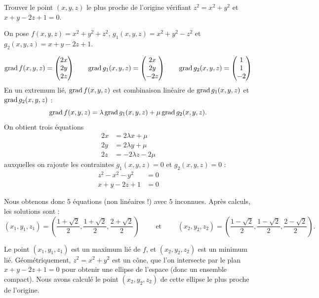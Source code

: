 \documentclass[11pt, class=report,crop=false]{standalone}
\begin{document}
\begin{exemple}
Trouver le point $(x,y,z)$ le plus proche de l'origine vérifiant $z^2 = x^2 + y^2$ et $x + y -2z+1=0$.

On pose $f(x,y,z) = x^2 + y^2 + z^2$, $g_1(x,y,z)= x^2 + y^2 - z^2$ et $g_2(x,y,z) = x + y -2z+1$.
 
$$
\operatorname{grad} f(x,y,z) = \begin{pmatrix} 2x \\ 2y \\ 2z \end{pmatrix}
\qquad \operatorname{grad} g_1(x,y,z) = \begin{pmatrix} 2x \\ 2y \\ -2z \end{pmatrix}
\qquad \operatorname{grad} g_2(x,y,z) = \begin{pmatrix} 1 \\ 1 \\ -2 \end{pmatrix}
$$
En un extremum lié, $\operatorname{grad} f(x,y,z)$ est combinaison linéaire de $\operatorname{grad} g_1(x,y,z)$
et $\operatorname{grad} g_2(x,y,z)$ :
$$\operatorname{grad} f(x,y,z) = \lambda \operatorname{grad} g_1(x,y,z) + \mu \operatorname{grad} g_2(x,y,z).$$
On obtient trois équations
\setcounter{equation}{0}
\begin{align}
2x &= 2\lambda x + \mu \label{eqeex1}\\
2y &= 2\lambda y  + \mu     \label{eqeex2}\\
2z &= -2\lambda z - 2\mu \label{eqeex3}
\end{align}
auxquelles on rajoute les contraintes $g_1(x,y,z) = 0$ et $g_2(x,y,z) = 0$ :
\begin{align}
z^2 - x^2 - y^2 &= 0  \label{eqeex4}\\
x + y -2z+1 &= 0      \label{eqeex5}
\end{align}

Nous obtenons donc $5$ équations (non linéaires !) avec $5$ inconnues.
Après calculs, les solutions sont :
$$(x_1,y_1,z_1) = \left( \frac{1+\sqrt2}{2}, \frac{1+\sqrt2}{2}, \frac{2+\sqrt2}{2} \right)
\qquad \text{ et } \qquad
(x_2,y_2,z_2) = \left( \frac{1-\sqrt2}{2}, \frac{1-\sqrt2}{2}, \frac{2-\sqrt2}{2} \right).$$

Le point $(x_1,y_1,z_1)$ est un maximum lié de $f$, et  $(x_2,y_2,z_2)$ est un minimum lié.
Géométriquement, $z^2 = x^2+y^2$ est un cône, que l'on intersecte par le plan $x + y -2z+1=0$ pour obtenir une ellipse de l'espace (donc un ensemble compact). Nous avons calculé le point $(x_2,y_2,z_2)$ de cette ellipse le plus proche de l'origine.
\end{exemple}
\end{document}
